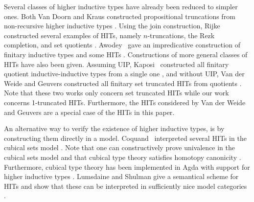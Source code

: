 Several classes of higher inductive types have already been reduced to simpler ones.
Both Van Doorn and Kraus constructed propositional truncations from non-recursive higher inductive types
\cite{Doorn16,Kraus16}.
Using the join construction, Rijke constructed several examples of HITs, namely $n$-truncations, the Rezk completion,
and set quotients \cite{rijke2017join}.
Awodey \etal \ gave an impredicative construction of finitary inductive types and some HITs \cite{awodey2018impredicative}. 
Constructions of more general classes of HITs have also been given.
Assuming UIP, Kaposi \etal \ constructed all finitary quotient inductive-inductive types
from a single one \cite{KaposiKA19}, and without UIP, Van der Weide and Geuvers
constructed all finitary set truncated HITs from quotients \cite{van2019construction}.
Note that these two works only concern set truncated HITs while our work concerns 1-truncated HITs.
Furthermore, the HITs considered by Van der Weide and Geuvers are a special case of
the HITs in this paper.

An alternative way to verify the existence of higher inductive types,
is by constructing them directly in a model.
Coquand \etal \ interpreted several HITs in the cubical sets model \cite{BezemCH13,CoquandHM18}.
Note that one can constructively prove univalence in the cubical sets model \cite{CohenCHM16}
and that cubical type theory satisfies homotopy canonicity \cite{DBLP:conf/rta/CoquandHS19}.
Furthermore, cubical type theory has been implemented in Agda with support for higher inductive types \cite{vezzosi2019cubical}.
Lumsdaine and Shulman give a semantical scheme for HITs and show that these can be interpreted
in sufficiently nice model categories \cite{lumsdaine2017semantics}.

